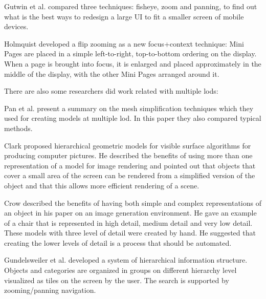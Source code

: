 Gutwin et al. \cite{gutwin2004interacting} compared three techniques: fisheye, zoom and panning, to find out what is the best ways to redesign a large UI to fit a smaller screen of mobile devices.

Holmquist \cite{holmquist1998zoom} developed a flip zooming as a new focus+context technique: Mini Pages are placed in a simple left-to-right, top-to-bottom ordering on the display. When a page is brought into focus, it is enlarged and placed approximately in the middle of the display, with the other Mini Pages arranged around it.

There are also some researchers did work related with multiple \glspl{lod}:

Pan et al. \cite{zhigeng1998overview} present a summary on the mesh simplification techniques which they used for creating models at multiple \gls{lod}. In this paper they also compared typical methods.

Clark \cite{clark1976hierarchical} proposed hierarchical geometric models for visible surface algorithms for producing computer pictures. He described the benefits of using more than one representation of a model for image rendering and pointed out that objects that cover a small area of the screen can be rendered from a simplified version of the object and that this allows more efficient rendering of a scene.

Crow \cite{crow1982more} described the benefits of having both simple and complex representations of an object in his paper on an image generation environment. He gave an example of a chair that is represented in high detail, medium detail and very low detail. These models with three level of detail were created by hand. He suggested that creating the lower levels of detail is a process that should be automated.

Gundelsweiler et al. \cite{gundelsweiler2007zeus} developed a system of hierarchical information structure. Objects and categories are organized in groups on different hierarchy level visualized as tiles on the screen by the user. The search is supported by zooming/panning navigation.







